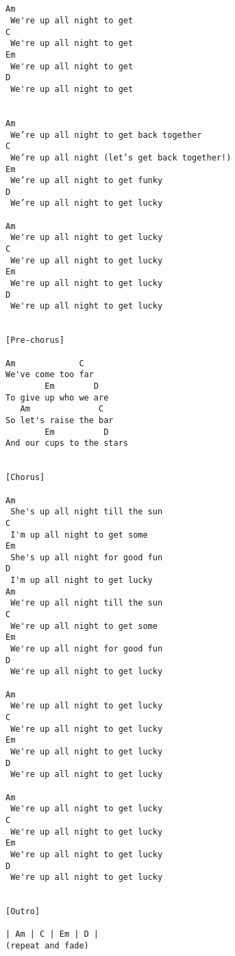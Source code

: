 \documentclass[../../songbookMain]{subfiles}
\begin{document}
\begin{verbatim}
 
 
Am
 We're up all night to get
C
 We're up all night to get
Em
 We're up all night to get
D
 We're up all night to get
 
 
Am
 We’re up all night to get back together
C
 We’re up all night (let’s get back together!)
Em
 We’re up all night to get funky
D
 We’re up all night to get lucky
 
Am
 We're up all night to get lucky
C
 We're up all night to get lucky
Em
 We're up all night to get lucky
D
 We're up all night to get lucky
 
 
[Pre-chorus]
 
Am             C
We've come too far
        Em        D
To give up who we are
   Am              C
So let's raise the bar
        Em          D
And our cups to the stars
 
 
[Chorus]
 
Am
 She's up all night till the sun
C
 I'm up all night to get some
Em
 She's up all night for good fun
D
 I'm up all night to get lucky
Am
 We're up all night till the sun
C
 We're up all night to get some
Em
 We're up all night for good fun
D
 We're up all night to get lucky
 
Am
 We're up all night to get lucky
C
 We're up all night to get lucky
Em
 We're up all night to get lucky
D
 We're up all night to get lucky
 
Am
 We're up all night to get lucky
C
 We're up all night to get lucky
Em
 We're up all night to get lucky
D
 We're up all night to get lucky
 
 
[Outro]
 
| Am | C | Em | D |
(repeat and fade)
\end{verbatim}
\end{document}
